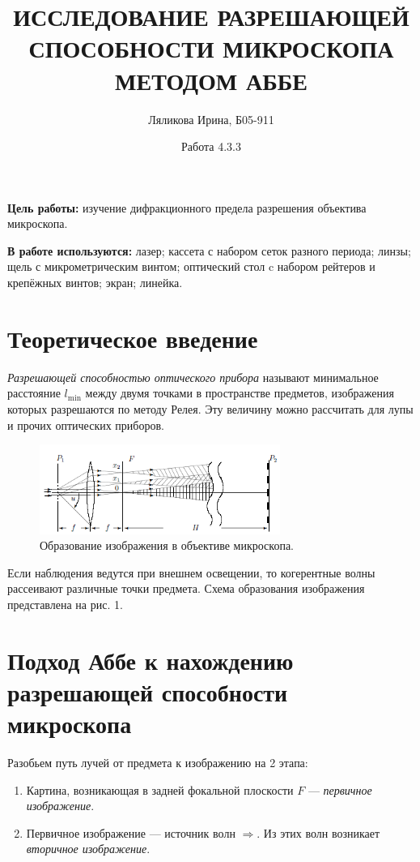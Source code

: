 \documentclass[a4paper,12pt]{article}
\title{ИССЛЕДОВАНИЕ РАЗРЕШАЮЩЕЙ СПОСОБНОСТИ МИКРОСКОПА МЕТОДОМ АББЕ}
\date{Работа 4.3.3}
\author{Ляликова Ирина, Б05-911}
\begin{document}
	
	\vspace{0.5 cm}
	\maketitle
	\vspace{0.5 cm}
	
	\textbf{Цель работы:} изучение дифракционного предела разрешения объектива микроскопа.\\
	\vspace{0.3 cm}
	
	\textbf{В работе используются:} лазер; кассета с набором сеток разного
	периода; линзы; щель с микрометрическим винтом; оптический стол
	c набором рейтеров и крепёжных винтов; экран; линейка.\\
	
	\section*{Теоретическое введение} 
	
	\textit{Разрешающей способностью оптического прибора} называют минимальное расстояние $l_{\min}$ между двумя точками в пространстве предметов, изображения которых разрешаются по методу Релея. Эту величину можно рассчитать для лупы и прочих оптических приборов.
	
	\begin{figure}[h]
		\begin{center}
			\includegraphics[width = 0.7\textwidth]{433-1.png}
			\caption{Образование изображения в объективе микроскопа.}
		\end{center}
	\end{figure}
	
	Если наблюдения ведутся при внешнем освещении, то когерентные волны рассеивают различные точки предмета. Схема образования изображения представлена на рис. 1.
	
	\section*{Подход Аббе к нахождению разрешающей способности микроскопа}
	Разобьем путь лучей от предмета к изображению на 2 этапа:
	\begin{enumerate}
		\item Картина, возникающая в задней фокальной плоскости $F$ --- \textit{первичное изображение}. 
		\item Первичное изображение --- источник волн $\Rightarrow$. Из этих волн возникает \textit{вторичное изображение}.
	\end{enumerate}
	
\end{document}
